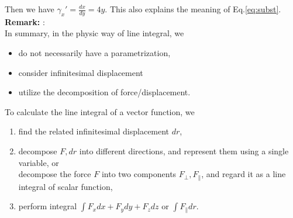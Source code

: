 \documentclass[11pt, t]{beamer}
\newcommand{\Remark}{\textbf{Remark: }}
\begin{document}
\begin{frame}[allowframebreaks]
    Then we have $\gamma_x'=\frac{dx}{dy}=4y$. This also explains the meaning of Eq.\ref{eq:subst}.
    \newpage
    \Remark:\\
    In summary, in the physic way of line integral, we
    \begin{itemize}
        \item do not necessarily have a parametrization,
        \item consider infinitesimal displacement
        \item utilize the decomposition of force/displacement.
    \end{itemize}
    To calculate the line integral of a vector function, we
    \begin{enumerate}
        \item find the related infinitesimal displacement $dr$,
        \item decompose $F, dr$ into different directions, and represent them using a single variable, or
              \\ decompose the force $F$ into two components $F_\perp, F_\parallel$, and regard it as a line integral of scalar function,
        \item perform integral $\int F_xdx+F_ydy+F_zdz$ or $\int F_\parallel dr$.
    \end{enumerate}
\end{frame}
\end{document}
